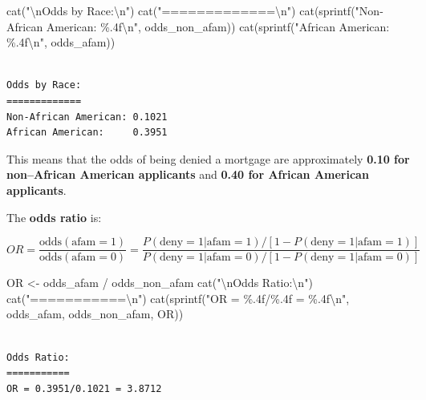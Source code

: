 \documentclass[
  12pt,
  letterpaper,
]{scrbook}
\newenvironment{Shaded}{\begin{snugshade}}{\end{snugshade}}
\newcommand{\FunctionTok}[1]{\textcolor[rgb]{0.28,0.35,0.67}{#1}}
\newcommand{\NormalTok}[1]{\textcolor[rgb]{0.00,0.23,0.31}{#1}}
\newcommand{\OtherTok}[1]{\textcolor[rgb]{0.00,0.23,0.31}{#1}}
\newcommand{\SpecialCharTok}[1]{\textcolor[rgb]{0.37,0.37,0.37}{#1}}
\newcommand{\StringTok}[1]{\textcolor[rgb]{0.13,0.47,0.30}{#1}}
\theoremstyle{plain}
\theoremstyle{definition}
\theoremstyle{remark}
\begin{document}
\begin{enumerate}
\begin{Shaded}
\begin{Highlighting}[]
\FunctionTok{cat}\NormalTok{(}\StringTok{"}\SpecialCharTok{\textbackslash{}n}\StringTok{Odds by Race:}\SpecialCharTok{\textbackslash{}n}\StringTok{"}\NormalTok{)}
\FunctionTok{cat}\NormalTok{(}\StringTok{"=============}\SpecialCharTok{\textbackslash{}n}\StringTok{"}\NormalTok{)}
\FunctionTok{cat}\NormalTok{(}\FunctionTok{sprintf}\NormalTok{(}\StringTok{"Non{-}African American: \%.4f}\SpecialCharTok{\textbackslash{}n}\StringTok{"}\NormalTok{, odds\_non\_afam))}
\FunctionTok{cat}\NormalTok{(}\FunctionTok{sprintf}\NormalTok{(}\StringTok{"African American:     \%.4f}\SpecialCharTok{\textbackslash{}n}\StringTok{"}\NormalTok{, odds\_afam))}
\end{Highlighting}
\end{Shaded}

\begin{verbatim}

Odds by Race:
=============
Non-African American: 0.1021
African American:     0.3951
\end{verbatim}

  This means that the odds of being denied a mortgage are approximately
  \textbf{0.10 for non--African American applicants} and \textbf{0.40
  for African American applicants}.

  The {\textbf{odds ratio}} is:

  \[
  OR = \frac{\text{odds}(\text{afam}=1)}{\text{odds}(\text{afam}=0)} = \frac{P(\text{deny}=1|\text{afam}=1)/[1-P(\text{deny}=1|\text{afam}=1)]}{P(\text{deny}=1|\text{afam}=0)/[1-P(\text{deny}=1|\text{afam}=0)]}
  \]

\begin{Shaded}
\begin{Highlighting}[]
\NormalTok{OR }\OtherTok{\textless{}{-}}\NormalTok{ odds\_afam }\SpecialCharTok{/}\NormalTok{ odds\_non\_afam}
\FunctionTok{cat}\NormalTok{(}\StringTok{"}\SpecialCharTok{\textbackslash{}n}\StringTok{Odds Ratio:}\SpecialCharTok{\textbackslash{}n}\StringTok{"}\NormalTok{)}
\FunctionTok{cat}\NormalTok{(}\StringTok{"===========}\SpecialCharTok{\textbackslash{}n}\StringTok{"}\NormalTok{)}
\FunctionTok{cat}\NormalTok{(}\FunctionTok{sprintf}\NormalTok{(}\StringTok{"OR = \%.4f/\%.4f = \%.4f}\SpecialCharTok{\textbackslash{}n}\StringTok{"}\NormalTok{, odds\_afam, odds\_non\_afam, OR))}
\end{Highlighting}
\end{Shaded}

\begin{verbatim}

Odds Ratio:
===========
OR = 0.3951/0.1021 = 3.8712
\end{verbatim}


\end{enumerate}
\end{document}
